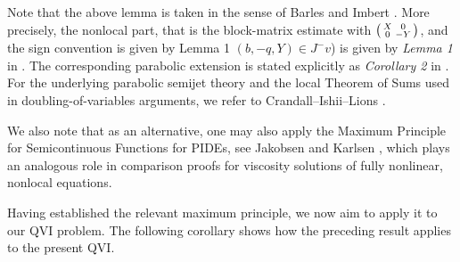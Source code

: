 \begin{remark}
    Note that the above lemma is taken in the sense of Barles and Imbert \cite{barles2008second}. More precisely, the nonlocal part, that is the block-matrix estimate with $\begin{psmallmatrix}X&0\\0&-Y\end{psmallmatrix}$, and the sign convention is given by Lemma 1 \cite{barles2008second} $(b,-q,Y)\in J^-v$) is given by \emph{Lemma 1} in \cite{barles2008second}. The corresponding parabolic extension is stated explicitly
    as \emph{Corollary 2} in \cite{barles2008second}. For the underlying parabolic semijet theory and the local Theorem of Sums used in doubling-of-variables
    arguments, we refer to Crandall--Ishii--Lions \cite[Theorem 8.3]{crandall1992user}.
    
    We also note that as an alternative, one may also apply the Maximum Principle for Semicontinuous Functions for PIDEs, see Jakobsen and Karlsen
    \cite{jakobsen2006maximum}, which plays an analogous role in comparison proofs for viscosity solutions of fully nonlinear, nonlocal equations.
\end{remark}

Having established the relevant maximum principle, we now aim to apply it to our QVI problem. The following corollary shows how the preceding result applies to the present QVI.

